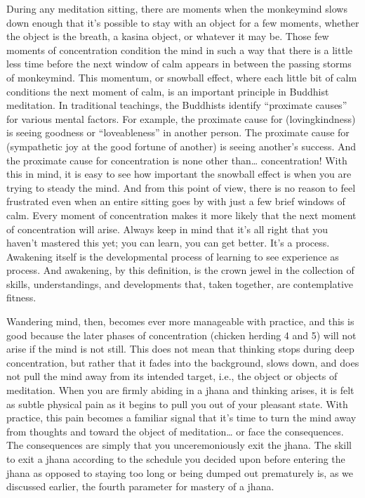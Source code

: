 \documentclass[a5paper,10pt,english]{book}
\begin{document}
\sphinxAtStartPar
During any meditation sitting, there are moments when the monkey\sphinxhyphen{}mind
slows down enough that it’s possible to stay with an object for a few
moments, whether the object is the breath, a kasina object, or whatever
it may be. Those few moments of concentration condition the mind in such
a way that there is a little less time before the next window of calm
appears in between the passing storms of monkey\sphinxhyphen{}mind. This momentum, or
snowball effect, where each little bit of calm conditions the next
moment of calm, is an important principle in Buddhist meditation. In
traditional teachings, the Buddhists identify “proximate causes” for
various mental factors. For example, the proximate cause for 
(lovingkindness) is seeing goodness or “loveableness” in another person.
The proximate cause for  (sympathetic joy at the good fortune of
another) is seeing another’s success. And the proximate cause for
concentration is none other than… concentration! With this in mind, it
is easy to see how important the snowball effect is when you are trying
to steady the mind. And from this point of view, there is no reason to
feel frustrated even when an entire sitting goes by with just a few
brief windows of calm. Every moment of concentration makes it more
likely that the next moment of concentration will arise. Always keep in
mind that it’s all right that you haven’t mastered this yet; you can
learn, you can get better. It’s a process. Awakening itself is the
developmental process of learning to see experience as process. And
awakening, by this definition, is the crown jewel in the collection of
skills, understandings, and developments that, taken together, are
contemplative fitness.

\sphinxAtStartPar
Wandering mind, then, becomes ever more manageable with practice, and
this is good because the later phases of concentration (chicken herding
4 and 5) will not arise if the mind is not still. This does not mean
that thinking stops during deep concentration, but rather that it fades
into the background, slows down, and does not pull the mind away from
its intended target, i.e., the object or objects of meditation. When you
are firmly abiding in a jhana and thinking arises, it is felt as subtle
physical pain as it begins to pull you out of your pleasant state. With
practice, this pain becomes a familiar signal that it’s time to turn the
mind away from thoughts and toward the object of meditation… or face the
consequences. The consequences are simply that you unceremoniously exit
the jhana. The skill to exit a jhana according to the schedule you
decided upon before entering the jhana as opposed to staying too long or
being dumped out prematurely is, as we discussed earlier, the fourth
parameter for mastery of a jhana.
\end{document}

